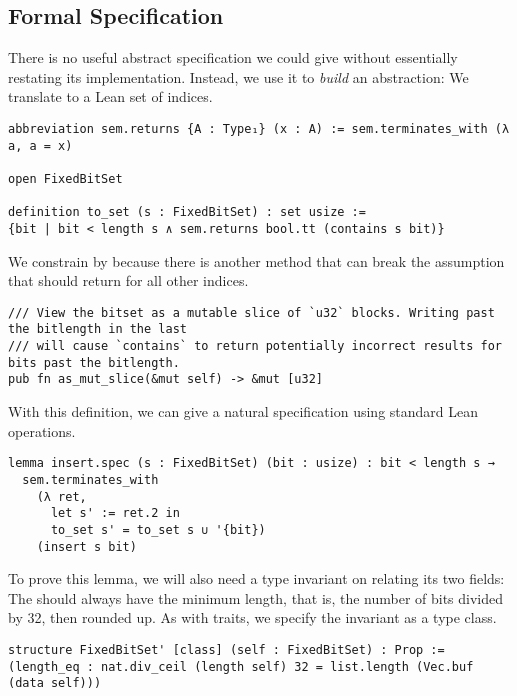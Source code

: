 \subsection{Formal Specification}

There is no useful abstract specification we could give  without
essentially restating its implementation. Instead, we use it to \emph{build} an
abstraction: We translate  to a Lean set of indices.

\begin{verbatim}
abbreviation sem.returns {A : Type₁} (x : A) := sem.terminates_with (λ a, a = x)

open FixedBitSet

definition to_set (s : FixedBitSet) : set usize :=
{bit | bit < length s ∧ sem.returns bool.tt (contains s bit)}
\end{verbatim}

We constrain  by  because there is another method
that can break the assumption that  should return 
for all other indices.

\begin{verbatim}
/// View the bitset as a mutable slice of `u32` blocks. Writing past the bitlength in the last
/// will cause `contains` to return potentially incorrect results for bits past the bitlength.
pub fn as_mut_slice(&mut self) -> &mut [u32]
\end{verbatim}

With this definition, we can give  a natural specification using
standard Lean  operations.

\begin{verbatim}
lemma insert.spec (s : FixedBitSet) (bit : usize) : bit < length s →
  sem.terminates_with
    (λ ret,
      let s' := ret.2 in
      to_set s' = to_set s ∪ '{bit})
    (insert s bit)
\end{verbatim}

To prove this lemma, we will also need a type invariant on  relating its two
fields: The  should always have the minimum length, that is, the
number of bits divided by 32, then rounded up. As with traits, we specify the
invariant as a type class.

\begin{verbatim}
structure FixedBitSet' [class] (self : FixedBitSet) : Prop :=
(length_eq : nat.div_ceil (length self) 32 = list.length (Vec.buf (data self)))
\end{verbatim}

